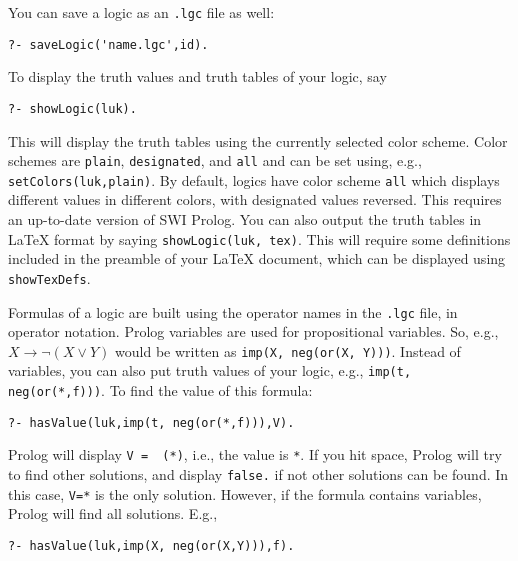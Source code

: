 \documentclass[
]{article}
\newcommand{\passthrough}[1]{#1}
\begin{document}
You can save a logic as an \passthrough{\lstinline!.lgc!} file as well:

\begin{lstlisting}
?- saveLogic('name.lgc',id).
\end{lstlisting}

To display the truth values and truth tables of your logic, say

\begin{lstlisting}
?- showLogic(luk).
\end{lstlisting}

This will display the truth tables using the currently selected color
scheme. Color schemes are \passthrough{\lstinline!plain!},
\passthrough{\lstinline!designated!}, and \passthrough{\lstinline!all!}
and can be set using, e.g.,
\passthrough{\lstinline!setColors(luk,plain)!}. By default, logics have
color scheme \passthrough{\lstinline!all!} which displays different
values in different colors, with designated values reversed. This
requires an up-to-date version of SWI Prolog. You can also output the
truth tables in LaTeX format by saying
\passthrough{\lstinline!showLogic(luk, tex)!}. This will require some
definitions included in the preamble of your LaTeX document, which can
be displayed using \passthrough{\lstinline!showTexDefs!}.

Formulas of a logic are built using the operator names in the
\passthrough{\lstinline!.lgc!} file, in operator notation. Prolog
variables are used for propositional variables. So, e.g.,
\(X \to \lnot(X \lor Y)\) would be written as
\passthrough{\lstinline!imp(X, neg(or(X, Y)))!}. Instead of variables,
you can also put truth values of your logic, e.g.,
\passthrough{\lstinline!imp(t, neg(or(*,f)))!}. To find the value of
this formula:

\begin{lstlisting}
?- hasValue(luk,imp(t, neg(or(*,f))),V).
\end{lstlisting}

Prolog will display \passthrough{\lstinline!V =  (*)!}, i.e., the value
is \passthrough{\lstinline!*!}. If you hit space, Prolog will try to
find other solutions, and display \passthrough{\lstinline!false.!} if
not other solutions can be found. In this case,
\passthrough{\lstinline!V=*!} is the only solution. However, if the
formula contains variables, Prolog will find all solutions. E.g.,

\begin{lstlisting}
?- hasValue(luk,imp(X, neg(or(X,Y))),f).
\end{lstlisting}
\end{document}

